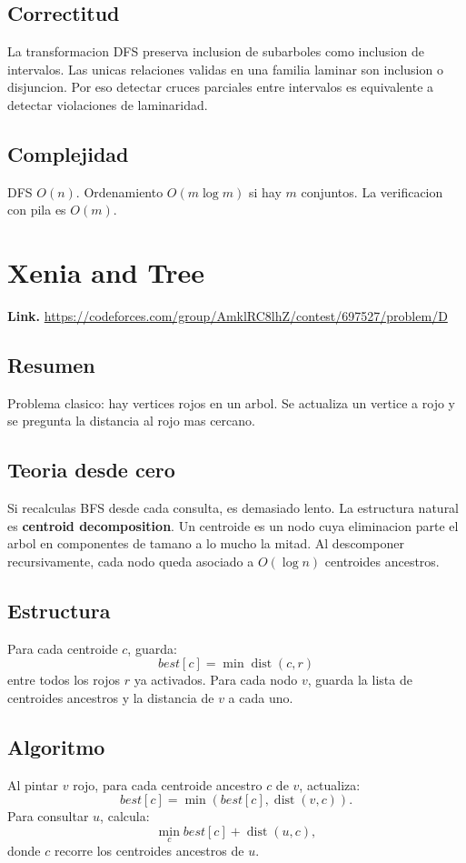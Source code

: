 \documentclass[10pt]{article}
\newcommand{\bigO}{O}
\newcommand{\dist}{\operatorname{dist}}
\begin{document}
\subsection*{Correctitud}
La transformacion DFS preserva inclusion de subarboles como inclusion de
intervalos. Las unicas relaciones validas en una familia laminar son inclusion o
disjuncion. Por eso detectar cruces parciales entre intervalos es equivalente a
detectar violaciones de laminaridad.

\subsection*{Complejidad}
DFS $\bigO(n)$. Ordenamiento $\bigO(m\log m)$ si hay $m$ conjuntos. La verificacion
con pila es $\bigO(m)$.

\clearpage
\section{Xenia and Tree}
\textbf{Link.} \url{https://codeforces.com/group/AmklRC8lhZ/contest/697527/problem/D}

\subsection*{Resumen}
Problema clasico: hay vertices rojos en un arbol. Se actualiza un vertice a rojo
y se pregunta la distancia al rojo mas cercano.

\subsection*{Teoria desde cero}
Si recalculas BFS desde cada consulta, es demasiado lento. La estructura natural
es \textbf{centroid decomposition}. Un centroide es un nodo cuya eliminacion
parte el arbol en componentes de tamano a lo mucho la mitad. Al descomponer
recursivamente, cada nodo queda asociado a $\bigO(\log n)$ centroides ancestros.

\subsection*{Estructura}
Para cada centroide $c$, guarda:
\[
best[c]=\min \dist(c,r)
\]
entre todos los rojos $r$ ya activados. Para cada nodo $v$, guarda la lista de
centroides ancestros y la distancia de $v$ a cada uno.

\subsection*{Algoritmo}
Al pintar $v$ rojo, para cada centroide ancestro $c$ de $v$, actualiza:
\[
best[c]=\min(best[c],\dist(v,c)).
\]
Para consultar $u$, calcula:
\[
\min_c best[c]+\dist(u,c),
\]
donde $c$ recorre los centroides ancestros de $u$.
\end{document}
